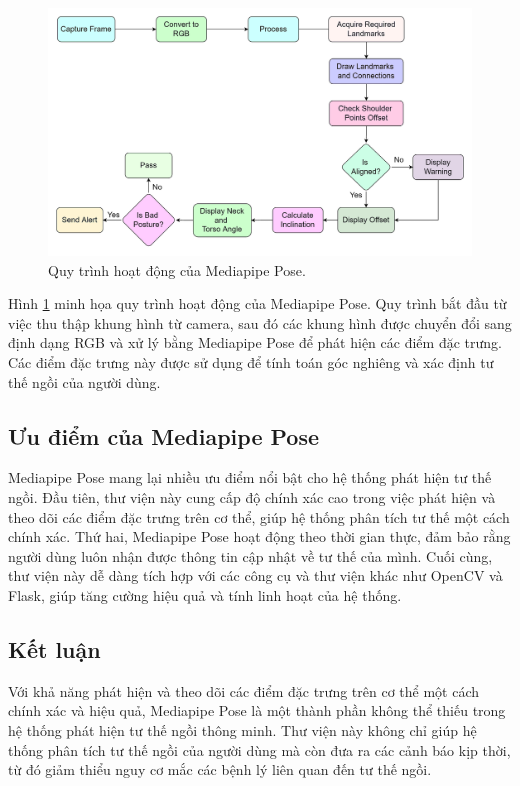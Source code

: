 \documentclass[conference]{IEEEtran}
\begin{document}
\begin{figure}[H]
    \centering
    \includegraphics[width=0.9\linewidth]{images/mediapipe_workflow.png}
    \caption{Quy trình hoạt động của Mediapipe Pose.}
    \label{fig:mediapipe_workflow}
\end{figure}

Hình \ref{fig:mediapipe_workflow} minh họa quy trình hoạt động của Mediapipe Pose. Quy trình bắt đầu từ việc thu thập khung hình từ camera, sau đó các khung hình được chuyển đổi sang định dạng RGB và xử lý bằng Mediapipe Pose để phát hiện các điểm đặc trưng. Các điểm đặc trưng này được sử dụng để tính toán góc nghiêng và xác định tư thế ngồi của người dùng.

\subsection{Ưu điểm của Mediapipe Pose}
Mediapipe Pose mang lại nhiều ưu điểm nổi bật cho hệ thống phát hiện tư thế ngồi. Đầu tiên, thư viện này cung cấp độ chính xác cao trong việc phát hiện và theo dõi các điểm đặc trưng trên cơ thể, giúp hệ thống phân tích tư thế một cách chính xác. Thứ hai, Mediapipe Pose hoạt động theo thời gian thực, đảm bảo rằng người dùng luôn nhận được thông tin cập nhật về tư thế của mình. Cuối cùng, thư viện này dễ dàng tích hợp với các công cụ và thư viện khác như OpenCV và Flask, giúp tăng cường hiệu quả và tính linh hoạt của hệ thống.

\subsection{Kết luận}
Với khả năng phát hiện và theo dõi các điểm đặc trưng trên cơ thể một cách chính xác và hiệu quả, Mediapipe Pose là một thành phần không thể thiếu trong hệ thống phát hiện tư thế ngồi thông minh. Thư viện này không chỉ giúp hệ thống phân tích tư thế ngồi của người dùng mà còn đưa ra các cảnh báo kịp thời, từ đó giảm thiểu nguy cơ mắc các bệnh lý liên quan đến tư thế ngồi.
\end{document}
